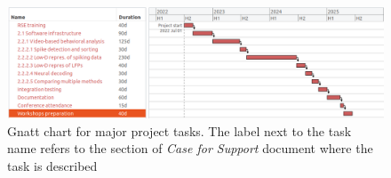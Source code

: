 \documentclass[a4paper,11point]{article}
\author{}
\date{}
\begin{document}
\begin{figure}[!t]
   \begin{center}
       \includegraphics[width=7in]{../costing/workPlan_coarse.png}

       \caption{Gnatt chart for major project tasks. The label next to the task
       name refers to the section of \emph{Case for Support} document where the
       task is described}

     \label{fig:gnattChart}
   \end{center}
\end{figure}
\end{document}

